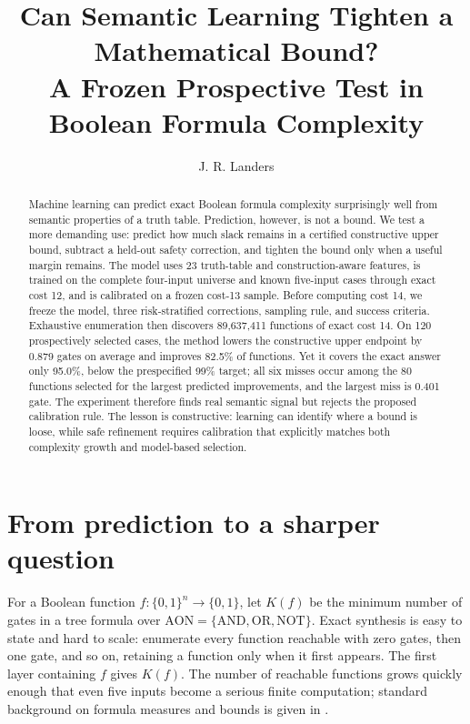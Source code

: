 \documentclass[11pt]{article}
\title{\vspace{-1.7em}\textbf{Can Semantic Learning Tighten a Mathematical Bound?}\\[-1pt]
\large A Frozen Prospective Test in Boolean Formula Complexity}
\author{J. R. Landers}
\date{\vspace{-1.4em}}
\newcommand{\AON}{\mathrm{AON}}
\begin{document}
\maketitle
\vspace{-1.6em}

\begin{abstract}
Machine learning can predict exact Boolean formula complexity surprisingly
well from semantic properties of a truth table.  Prediction, however, is not
a bound.  We test a more demanding use: predict how much slack remains in a
certified constructive upper bound, subtract a held-out safety correction,
and tighten the bound only when a useful margin remains.  The model uses 23
truth-table and construction-aware features, is trained on the complete
four-input universe and known five-input cases through exact cost 12, and is
calibrated on a frozen cost-13 sample.  Before computing cost 14, we freeze the
model, three risk-stratified corrections, sampling rule, and success criteria.
Exhaustive enumeration then discovers 89,637,411 functions of exact cost 14.
On 120 prospectively selected cases, the method lowers the constructive upper
endpoint by 0.879 gates on average and improves 82.5\% of functions.  Yet it
covers the exact answer only 95.0\%, below the prespecified 99\% target; all
six misses occur among the 80 functions selected for the largest predicted
improvements, and the largest miss is 0.401 gate.  The experiment therefore
finds real semantic signal but rejects the proposed calibration rule.  The
lesson is constructive: learning can identify where a bound is loose, while
safe refinement requires calibration that explicitly matches both complexity
growth and model-based selection.
\end{abstract}

\section{From prediction to a sharper question}

For a Boolean function $f:\{0,1\}^n\to\{0,1\}$, let $K(f)$ be the minimum
number of gates in a tree formula over
$\AON=\{\mathrm{AND},\mathrm{OR},\mathrm{NOT}\}$.  Exact synthesis is easy to
state and hard to scale: enumerate every function reachable with zero gates,
then one gate, and so on, retaining a function only when it first appears.
The first layer containing $f$ gives $K(f)$.  The number of reachable
functions grows quickly enough that even five inputs become a serious finite
computation; standard background on formula measures and bounds is given in
\cite{jukna2012}.
\end{document}
